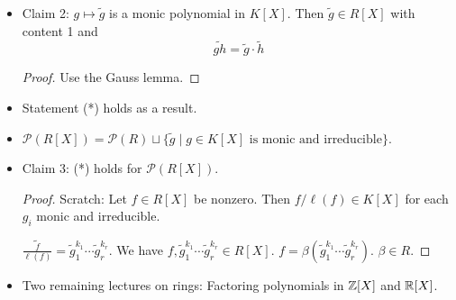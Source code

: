 \documentclass[../notes.tex]{subfiles}
\begin{document}
\begin{itemize}
\begin{proof}
        Denote $\beta g$ by $\tilde{g}$. Then the claim is that $\tilde{g}\in R[X]$ has content 1. Thus,
        \begin{equation*}
            \frac{\tilde{g}}{\ell(\tilde{g})} = g
        \end{equation*}
    \end{proof}
    \item Claim 2: $g\mapsto\tilde{g}$ is a monic polynomial in $K[X]$. Then $\tilde{g}\in R[X]$ with content 1 and
    \begin{equation*}
        \widetilde{gh} = \tilde{g}\cdot\tilde{h}
    \end{equation*}
    \begin{proof}
        Use the Gauss lemma.
    \end{proof}
    \item Statement (*) holds as a result.
    \item $\mathcal{P}(R[X])=\mathcal{P}(R)\sqcup\{\tilde{g}\mid g\in K[X]\text{ is monic and irreducible}\}$.
    \item Claim 3: (*) holds for $\mathcal{P}(R[X])$.
    \begin{proof}
        Scratch: Let $f\in R[X]$ be nonzero. Then $f/\ell(f)\in K[X]$ for each $g_i$ monic and irreducible.\par
        $\widetilde{\frac{f}{\ell(f)}}=\tilde{g}_1^{k_1}\cdots\tilde{g}_r^{k_r}$. We have $f,\tilde{g}_1^{k_1}\cdots\tilde{g}_r^{k_r}\in R[X]$. $f=\beta(\tilde{g}_1^{k_1}\cdots\tilde{g}_r^{k_r})$. $\beta\in R$.
    \end{proof}
    \item Two remaining lectures on rings: Factoring polynomials in $\mathbb{Z}[X]$ and $\mathbb{R}[X]$.
\end{itemize}
\end{document}

